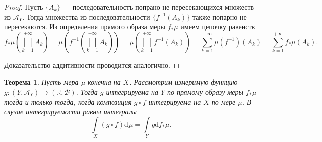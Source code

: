 \documentclass[12pt]{article}
\newtheorem{theorem}{Теорема}
\numberwithin{theorem}{section}
\theoremstyle{definition}
\newcommand{\RR}{\mathbb{R}}
\newcommand{\calA}{\mathcal{A}}
\newcommand{\calB}{\mathcal{B}}
\newcommand{\diff}{\mathrm{d}}
\begin{document}
	\begin{proof}
		Пусть $ \{A_k\} $ --- последовательность попрано не пересекающихся множеств из $ \calA_Y $.
		Тогда множества из последовательности $ \{f^{-1}(A_k)\} $ также попарно не пересекаются. 
		Из определения прямого образа меры $ f_{*}\mu $ имеем цепочку равенств
		$$ f_*\mu\left(\bigsqcup\limits_{k = 1}^{+\infty} A_k\right) 
		= \mu\left(f^{-1}\left(\bigsqcup\limits_{k = 1}^{+\infty} A_k\right)\right)
		= \mu\left(\bigsqcup\limits_{k = 1}^{+\infty} f^{-1}(A_k)\right)
		= \sum\limits_{k = 1}^{+\infty} \mu(f^{-1})(A_k)
		= \sum\limits_{k = 1}^{+\infty} f_{*}\mu(A_k). $$
		
		Доказательство аддитивности проводится аналогично.
	\end{proof}
	
	\begin{theorem} \label{pushforward measure main property}
		Пусть мера $ \mu $ конечна на $ X $.
		Рассмотрим измеримую функцию $ g \colon (Y, \calA_Y) \to (\RR, \calB) $.
		Тогда $ g $ интегрируема на $ Y $ по прямому образу меры $ f_*\mu $
		тогда и только тогда, когда композиция $ g \circ f $ интегрируема на $ X $ по мере $ \mu $.
		В случае интегрируемости равны интегралы
		$$ \int\limits_{X} (g \circ f)\diff\mu = \int\limits_{Y} g\diff f_*\mu. $$
	\end{theorem}
	
\end{document}
